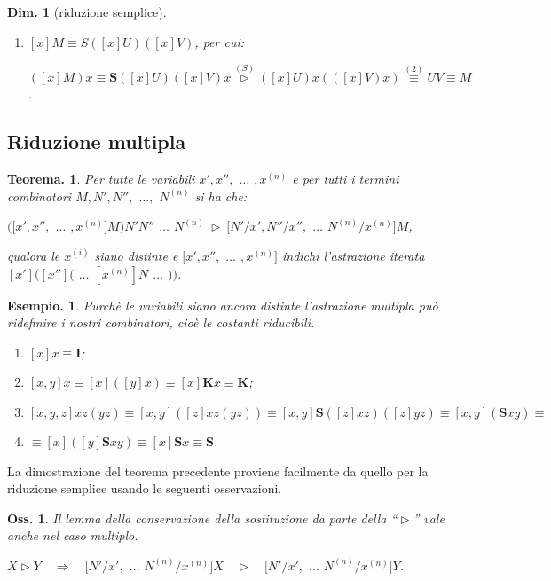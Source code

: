\documentclass{book}
\newtheorem{osservazione}{Oss.}[chapter]
\newtheorem{teorema}{Teorema.}[chapter]
\newtheorem{dimostrazione}{Dim.}[chapter]
\newtheorem{esempio}{Esempio.}
\newcommand*{\ii}{\mathbf{I}}    %
\newcommand*{\kk}{\mathbf{K}}    %
\newcommand*{\sss}{\mathbf{S}}   %
\begin{document}
\begin{dimostrazione}[riduzione semplice]
\begin{enumerate}
\[
 ([x]U)x \vartriangleright U\text{ e }([x]V)x \vartriangleright V.
\qquad  (2)
\]

\item[]$[x]M \equiv  S([x]U)([x]V)$, per cui:

 $([x]M)x  \equiv  \sss ([x]U)([x]V)x \stackrel{(S)}{\vartriangleright}  
([x]U)x(([x]V)x) \stackrel{(2)}{\equiv}  UV 
 \equiv  M$.
\end{enumerate}

\end{dimostrazione}

\subsection{Riduzione multipla}
\begin{teorema}
Per tutte le variabili $x', x'',$ $\ldots$ $, x^{(n)}$ e per tutti i termini
combinatori $M, N', N'',$ $\ldots,$ $N^{(n)}$ si ha che:
\begin{center}
$([x', x'', $ $\ldots$ $, x^{(n)}]M)N'N''$ $\ldots$ $N^{(n)} \
\vartriangleright \ [N'/x', N''/x'', $ $\ldots$ $ N^{(n)}/x^{(n)}]M$,
\end{center}
qualora le $x^{(i)}$ siano distinte e $[x', x'',$ $\ldots$ $, x^{(n)}]$
indichi l'astrazione iterata $[x']([x'']($ $\ldots$ $[x^{(n)}]N$ $\ldots$ $))$.
\end{teorema}

\begin{esempio}
Purch\`e le variabili siano ancora distinte l'astrazione multipla pu\`o
ridefinire i nostri combinatori, cio\`e le costanti riducibili.
\begin{enumerate}
\item[-]$[x]x \equiv \ii$;
\item[-]$[x, y]x \equiv [x]([y]x) \equiv [x]\kk x \equiv \kk$;
\item[-]$[x, y, z]xz(yz) \equiv [x,y]([z]xz(yz)) \equiv [x,y]\sss([z]xz)([z]yz)
\equiv [x, y](\sss xy) \equiv$
\item[]$\equiv [x]([y]\sss xy) \equiv [x]\sss x \equiv \sss$.
\end{enumerate}
\end{esempio}
La dimostrazione del teorema precedente proviene facilmente da quello per la
riduzione semplice usando le seguenti osservazioni.
\begin{osservazione}
Il lemma della conservazione della sostituzione da parte della
``$\vartriangleright$'' vale anche nel caso multiplo.
\begin{center}
$X \vartriangleright Y \quad \Longrightarrow \quad [N'/x', $ $\ldots$ $ N^{(n)}
/x^{(n)}]X \quad \vartriangleright \quad [N'/x', $ $\ldots$ $
N^{(n)}/x^{(n)}]Y$.
\end{center}
\end{osservazione}
\end{document}
